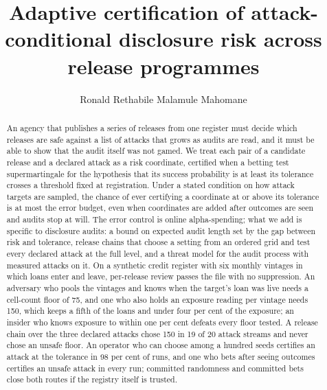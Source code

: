 \documentclass{jpc}
\theoremstyle{remark}
\begin{document}
\title[Adaptive certification of disclosure risk]{Adaptive certification of attack-conditional disclosure risk across release programmes}
\author{Ronald Rethabile Malamule Mahomane}
\address{Department of Computing, Mathematical and Statistical Sciences, University of Namibia, Windhoek; School of Pathology, Faculty of Health Sciences, University of the Witwatersrand, Johannesburg; Basis Energy, Victoria, Australia}
\begin{abstract}
An agency that publishes a series of releases from one register must decide which releases are safe against a list of attacks that grows as audits are read, and it must be able to show that the audit itself was not gamed. We treat each pair of a candidate release and a declared attack as a risk coordinate, certified when a betting test supermartingale for the hypothesis that its success probability is at least its tolerance crosses a threshold fixed at registration. Under a stated condition on how attack targets are sampled, the chance of ever certifying a coordinate at or above its tolerance is at most the error budget, even when coordinates are added after outcomes are seen and audits stop at will. The error control is online alpha-spending; what we add is specific to disclosure audits: a bound on expected audit length set by the gap between risk and tolerance, release chains that choose a setting from an ordered grid and test every declared attack at the full level, and a threat model for the audit process with measured attacks on it. On a synthetic credit register with six monthly vintages in which loans enter and leave, per-release review passes the file with no suppression. An adversary who pools the vintages and knows when the target's loan was live needs a cell-count floor of 75, and one who also holds an exposure reading per vintage needs 150, which keeps a fifth of the loans and under four per cent of the exposure; an insider who knows exposure to within one per cent defeats every floor tested. A release chain over the three declared attacks chose 150 in 19 of 20 attack streams and never chose an unsafe floor. An operator who can choose among a hundred seeds certifies an attack at the tolerance in 98 per cent of runs, and one who bets after seeing outcomes certifies an unsafe attack in every run; committed randomness and committed bets close both routes if the registry itself is trusted.
\end{abstract}
\maketitle
\end{document}
